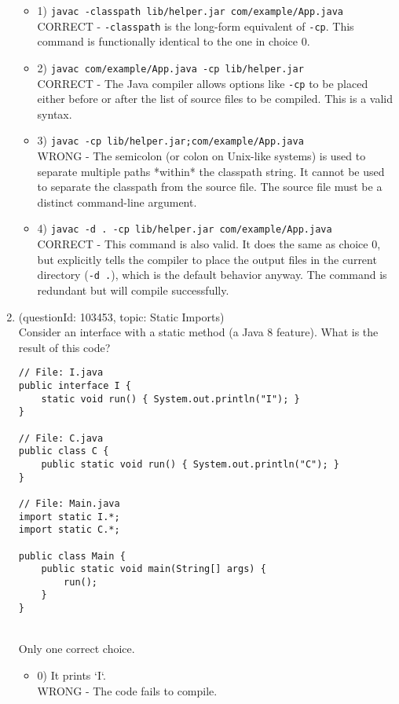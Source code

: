 \documentclass[12pt]{article}
\begin{document}
\begin{enumerate}[label=(\arabic*)]
\begin{itemize}
\item 1) \verb|javac -classpath lib/helper.jar com/example/App.java|
 \\ 
CORRECT - \verb|-classpath| is the long-form equivalent of \verb|-cp|. This command is functionally identical to the one in choice 0.

\item 2) \verb|javac com/example/App.java -cp lib/helper.jar|
 \\ 
CORRECT - The Java compiler allows options like \verb|-cp| to be placed either before or after the list of source files to be compiled. This is a valid syntax.

\item 3) \verb|javac -cp lib/helper.jar;com/example/App.java|
 \\ 
WRONG - The semicolon (or colon on Unix-like systems) is used to separate multiple paths *within* the classpath string. It cannot be used to separate the classpath from the source file. The source file must be a distinct command-line argument.

\item 4) \verb|javac -d . -cp lib/helper.jar com/example/App.java|
 \\ 
CORRECT - This command is also valid. It does the same as choice 0, but explicitly tells the compiler to place the output files in the current directory (\verb|-d .|), which is the default behavior anyway. The command is redundant but will compile successfully.

\end{itemize}
\item (questionId: 103453, topic: Static Imports) \\ 
Consider an interface with a static method (a Java 8 feature). What is the result of this code?
\begin{verbatim}
// File: I.java
public interface I {
    static void run() { System.out.println("I"); }
}

// File: C.java
public class C {
    public static void run() { System.out.println("C"); }
}

// File: Main.java
import static I.*;
import static C.*;

public class Main {
    public static void main(String[] args) {
        run();
    }
}
\end{verbatim}
\\ \noindent Only one correct choice. 
\begin{itemize}
\item 0) It prints `I`.
 \\ 
WRONG - The code fails to compile.


\end{itemize}
\end{enumerate}
\end{document}
